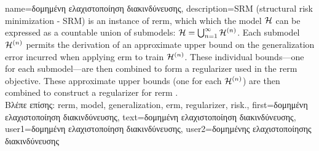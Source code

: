 {name={\foreignlanguage{greek}{δομημένη ελαχιστοποίηση διακινδύνευσης}}, 
	description={SRM (structural risk minimization - SRM) is an
		instance of \gls{rerm}, which which the \gls{model} $\mathcal{H}$ can be expressed 
		as a countable union of submodels: $\mathcal{H} = \bigcup_{n=1}^{\infty} \mathcal{H}^{(n)}$. 
		Each submodel $\mathcal{H}^{(n)}$ permits the derivation of an approximate upper bound 
		on the \gls{generalization} error incurred when applying \gls{erm} to train $\mathcal{H}^{(n)}$. 
		These individual bounds—one for each submodel—are then combined to form a \gls{regularizer} 
		used in the \gls{rerm} objective. 
        		These approximate upper bounds (one for each $\mathcal{H}^{(n)}$) are then combined 
		to construct a \gls{regularizer} for \gls{rerm} \cite[Sec.\ 7.2]{ShalevMLBook}.\\
		\foreignlanguage{greek}{Βλέπε επίσης:} \gls{rerm}, \gls{model}, \gls{generalization}, \gls{erm}, \gls{regularizer}, \gls{risk}.},
		first={\foreignlanguage{greek}{δομημένη ελαχιστοποίηση διακινδύνευσης}},
		text={\foreignlanguage{greek}{δομημένη ελαχιστοποίηση διακινδύνευσης}},
		user1={\foreignlanguage{greek}{δομημένη ελαχιστοποίηση διακινδύνευσης}}, %
  	   	user2={\foreignlanguage{greek}{δομημένης ελαχιστοποίησης διακινδύνευσης}} %
 }

